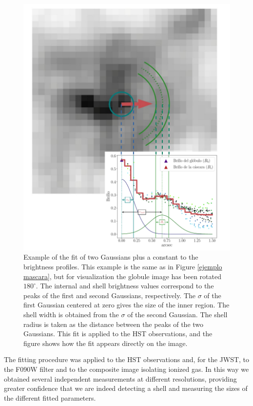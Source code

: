 \documentclass{book}
\begin{document}
\begin{figure}[htbp]
    \centering
    \includegraphics[width=\textwidth]{imagenes_corregidas/Ejemplo_ajuste_final.pdf}
    \caption{Example of the fit of two Gaussians plus a constant to
      the brightness profiles. This example is the same as in Figure
      \ref{ejemplo mascara}, but for visualization the globule image
      has been rotated $180^\circ$. The internal and shell brightness
      values correspond to the peaks of the first and second
      Gaussians, respectively. The $\sigma$ of the first Gaussian
      centered at zero gives the size of the inner region. The shell
      width is obtained from the $\sigma$ of the second Gaussian. The
      shell radius is taken as the distance between the peaks of the
      two Gaussians. This fit is applied to the HST observations, and
      the figure shows how the fit appears directly on the image.}
    \label{ejemplo ajuste}
\end{figure}

The fitting procedure was applied to the HST observations and, for the
JWST, to the F090W filter and to the composite image isolating ionized
gas. In this way we obtained several independent measurements at
different resolutions, providing greater confidence that we are indeed
detecting a shell and measuring the sizes of the different fitted
parameters.
\end{document}
